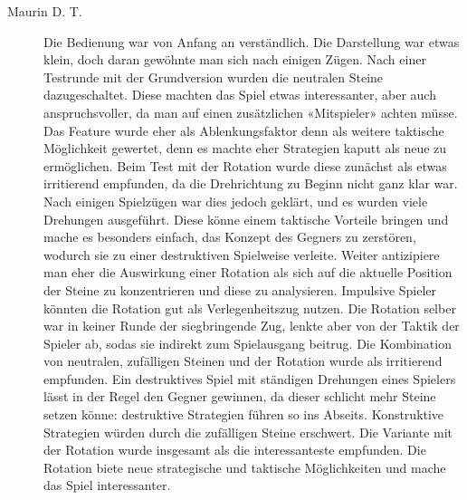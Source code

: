\documentclass[a4paper,11pt,hidelinks]{scrartcl}
\begin{document}
\begin{description}
    \item[Maurin D. T.] Die Bedienung war von Anfang an verständlich. Die Darstellung war etwas klein, doch daran gewöhnte man sich nach einigen Zügen. Nach einer Testrunde mit der Grundversion wurden die neutralen Steine dazugeschaltet. Diese machten das Spiel etwas interessanter, aber auch anspruchsvoller, da man auf einen zusätzlichen «Mitspieler» achten müsse. Das Feature wurde eher als Ablenkungsfaktor denn als weitere taktische Möglichkeit gewertet, denn es machte eher Strategien kaputt als neue zu ermöglichen. Beim Test mit der Rotation wurde diese zunächst als etwas irritierend empfunden, da die Drehrichtung zu Beginn nicht ganz klar war. Nach einigen Spielzügen war dies jedoch geklärt, und es wurden viele Drehungen ausgeführt. Diese könne einem taktische Vorteile bringen und mache es besonders einfach, das Konzept des Gegners zu zerstören, wodurch sie zu einer destruktiven Spielweise verleite. Weiter antizipiere man eher die Auswirkung einer Rotation als sich auf die aktuelle Position der Steine zu konzentrieren und diese zu analysieren. Impulsive Spieler könnten die Rotation gut als Verlegenheitszug nutzen. Die Rotation selber war in keiner Runde der siegbringende Zug, lenkte aber von der Taktik der Spieler ab, sodas sie indirekt zum Spielausgang beitrug. Die Kombination von neutralen, zufälligen Steinen und der Rotation wurde als irritierend empfunden. Ein destruktives Spiel mit ständigen Drehungen eines Spielers lässt in der Regel den Gegner gewinnen, da dieser schlicht mehr Steine setzen könne: destruktive Strategien führen so ins Abseits. Konstruktive Strategien würden durch die zufälligen Steine erschwert. Die Variante mit der Rotation wurde insgesamt als die interessanteste empfunden. Die Rotation biete neue strategische und taktische Möglichkeiten und mache das Spiel interessanter.

\end{description}
\end{document}

